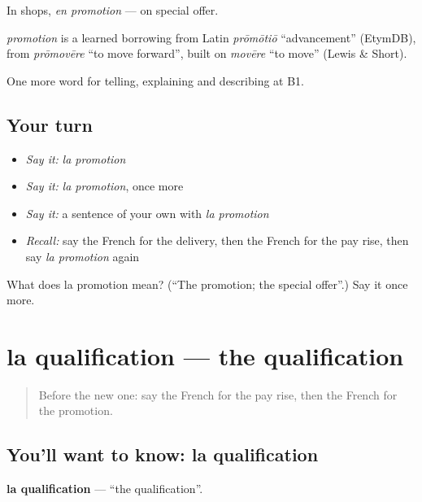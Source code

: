 In shops, \emph{en promotion} — on special offer.

\begin{cousinweb}
\emph{promotion} is a learned borrowing from Latin \emph{prōmōtiō} \textquotedblleft{}advancement\textquotedblright{} (EtymDB), from \emph{prōmovēre} \textquotedblleft{}to move forward\textquotedblright{}, built on \emph{movēre} \textquotedblleft{}to move\textquotedblright{} (Lewis \& Short).
\end{cousinweb}

\begin{grammarlens}[title={What you've built}]
One more word for telling, explaining and describing at B1.
\end{grammarlens}

\subsection*{Your turn}
\begin{itemize}
\raggedright
  \item \emph{Say it:} \emph{la promotion}
  \item \emph{Say it:} \emph{la promotion}, once more
  \item \emph{Say it:} a sentence of your own with \emph{la promotion}
  \item \emph{Recall:} say the French for the delivery, then the French for the pay rise, then say \emph{la promotion} again
\end{itemize}

\begin{tcolorbox}[breakable,colback=teal!4,colframe=teal!35!black,title={Before you move on}]
What does la promotion mean? (\textquotedblleft{}The promotion; the special offer\textquotedblright{}.) Say it once more.
\end{tcolorbox}
\section[la qualification]{la qualification — the qualification}

\label{lesson:FR-C360-qualification}



\begin{quote}
Before the new one: say the French for the pay rise, then the French for the promotion.
\end{quote}

\subsection*{You'll want to know: la qualification}
\textbf{la qualification} — \textquotedblleft{}the qualification\textquotedblright{}.

